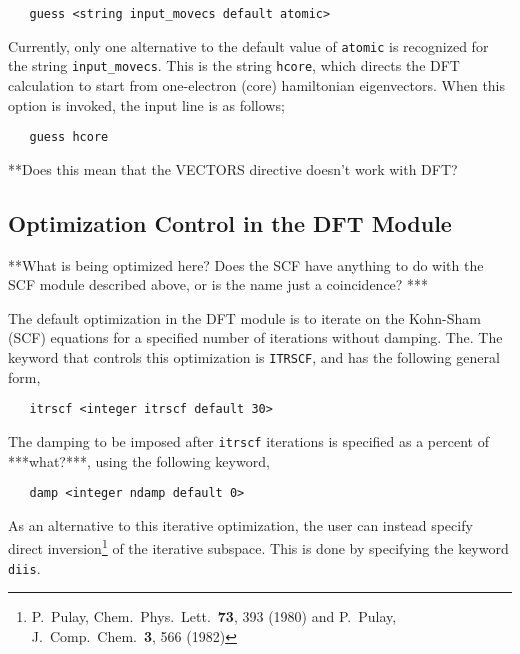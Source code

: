 \begin{verbatim}
   guess <string input_movecs default atomic>
\end{verbatim}

Currently, only one alternative to the default value of {\tt atomic} is
recognized for the string \verb+input_movecs+.  This is the string {\tt hcore},
which directs the DFT calculation to start from one-electron (core)
hamiltonian eigenvectors.  When this option is invoked, the input line is
as follows;

\begin{verbatim}
   guess hcore
\end{verbatim}

\Large
**Does this mean that the VECTORS directive doesn't work with DFT?
\normalsize

\subsection{Optimization Control in the DFT Module}
\label{opt}

\Large
**What is being optimized here?  Does the SCF have anything to do
with the SCF module described above, or is the name just a coincidence?
***
\normalsize

The default optimization in the DFT module is to iterate on the 
Kohn-Sham (SCF) equations for a specified number of iterations 
without damping.  The.  The keyword that controls this optimization 
is \verb+ITRSCF+, and has the following general form,

\begin{verbatim}
   itrscf <integer itrscf default 30>
\end{verbatim}

The damping to be imposed after \verb+itrscf+ iterations is specified
as a percent of ***what?***, using the following keyword,

\begin{verbatim}
   damp <integer ndamp default 0>
\end{verbatim}

As an alternative to this iterative optimization, the user can instead
specify direct inversion\footnote {P.~Pulay,  Chem.\ Phys.\ Lett.\ {\bf 73}, 
393 (1980) and P.~Pulay,  J.~Comp.~Chem.~{\bf 3}, 566 (1982)} of the
iterative subspace.  This is done by specifying the keyword \verb+diis+.

